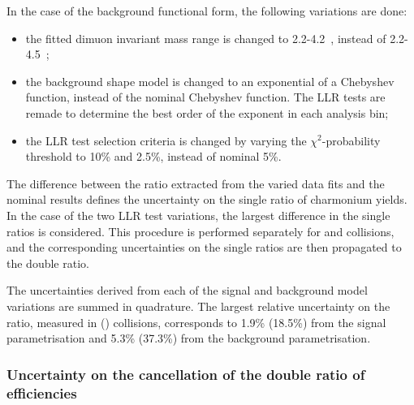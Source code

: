 In the case of the background functional form, the following variations are done:
\begin{itemize}
 \item the fitted dimuon invariant mass range is changed to 2.2-4.2~\GeVcc, instead of 2.2-4.5~\GeVcc;
 \item the background shape model is changed to an exponential of a Chebyshev function, instead of the nominal Chebyshev function. The LLR tests are remade to determine the best order of the exponent in each analysis bin;
 \item the LLR test selection criteria is changed by varying the $\chi^{2}$-probability threshold to 10\% and 2.5\%, instead of nominal 5\%.
\end{itemize}

The difference between the \singleRatio ratio extracted from the varied data fits and the nominal results defines the uncertainty on the single ratio of charmonium yields. In the case of the two LLR test variations, the largest difference in the single ratios is considered. This procedure is performed separately for \Runpp and \RunPbPb collisions, and the corresponding uncertainties on the single ratios are then propagated to the double ratio.

The uncertainties derived from each of the signal and background model variations are summed in quadrature. The largest relative uncertainty on the \singleRatio ratio, measured in \Runpp (\RunPbPb) collisions, corresponds to 1.9\% (18.5\%) from the signal parametrisation and 5.3\% (37.3\%) from the background parametrisation.

\subsubsection{Uncertainty on the cancellation of the double ratio of efficiencies}\label{sec:Charmonia_Analysis_PsiPoverJPsiRatioSystematics_Effiency}

